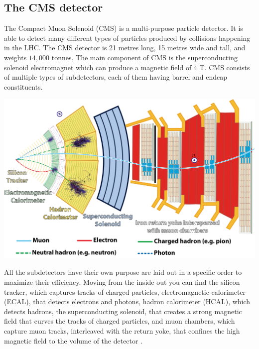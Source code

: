 \documentclass[a0,portrait]{a0poster}
\begin{document}
\begin{multicols}{2}
\vspace{-0.2cm}
\section*{The CMS detector}
\vspace{-0.2cm}
The Compact Muon Solenoid (CMS) is a multi-purpose particle detector.
It is able to detect many different types of particles produced by collisions happening in the LHC.
The CMS detector is 21 metres long, 15 metres wide and tall, and weights $14,000$ tonnes.
The main component of CMS is the superconducting solenoid electromagnet which can produce a magnetic field of $4$ T.
CMS consists of multiple types of subdetectors, each of them having barrel and endcap constituents.

\vspace{0.5cm}
\begin{centering}
	\includegraphics[width=0.8\linewidth]{CMSslice.png}
	\vspace{-0.5cm}
\end{centering}
\vspace{0.5cm}

\noindent All the subdetectors have their own purpose are laid out in a specific order to maximize their efficiency.
Moving from the inside out you can find the silicon tracker, which captures tracks of charged particles, electromagnetic
calorimeter (ECAL), that detects electrons and photons, hadron calorimeter (HCAL), which detects hadrons, the
superconducting solenoid, that creates a strong magnetic field that curves the tracks of charged particles,
and muon chambers, which capture muon tracks, interleaved with the return yoke, that confines the high magnetic
field to the volume of the detector \cite{CMSdetector}.


\end{multicols}
\end{document}
